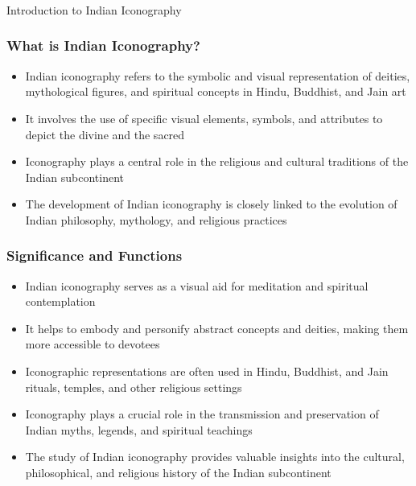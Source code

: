 \begin{frame}[fragile]\frametitle{}
\begin{center}
{\Large Introduction to Indian Iconography}
\end{center}
\end{frame}

\begin{frame}[fragile]\frametitle{What is Indian Iconography?}
    \begin{itemize}
        \item Indian iconography refers to the symbolic and visual representation of deities, mythological figures, and spiritual concepts in Hindu, Buddhist, and Jain art
        \item It involves the use of specific visual elements, symbols, and attributes to depict the divine and the sacred
        \item Iconography plays a central role in the religious and cultural traditions of the Indian subcontinent
        \item The development of Indian iconography is closely linked to the evolution of Indian philosophy, mythology, and religious practices
    \end{itemize}
\end{frame}

\begin{frame}[fragile]\frametitle{Significance and Functions}
    \begin{itemize}
        \item Indian iconography serves as a visual aid for meditation and spiritual contemplation
        \item It helps to embody and personify abstract concepts and deities, making them more accessible to devotees
        \item Iconographic representations are often used in Hindu, Buddhist, and Jain rituals, temples, and other religious settings
        \item Iconography plays a crucial role in the transmission and preservation of Indian myths, legends, and spiritual teachings
        \item The study of Indian iconography provides valuable insights into the cultural, philosophical, and religious history of the Indian subcontinent
    \end{itemize}
\end{frame}

